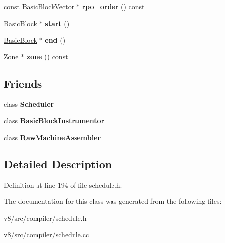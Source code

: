 \begin{DoxyCompactItemize}
\mbox{\label{classv8_1_1internal_1_1compiler_1_1Schedule_a739858a02ad92eafc2d2d537ecbdba2e}} 
const \mbox{\hyperlink{classv8_1_1internal_1_1ZoneVector}{Basic\+Block\+Vector}} $\ast$ {\bfseries rpo\+\_\+order} () const
\item 
\mbox{\label{classv8_1_1internal_1_1compiler_1_1Schedule_adddc0d247b7f03ccf5796854cf34b4bc}} 
\mbox{\hyperlink{classv8_1_1internal_1_1compiler_1_1BasicBlock}{Basic\+Block}} $\ast$ {\bfseries start} ()
\item 
\mbox{\label{classv8_1_1internal_1_1compiler_1_1Schedule_a3c3967add3df64ec380f3e06644e1b2c}} 
\mbox{\hyperlink{classv8_1_1internal_1_1compiler_1_1BasicBlock}{Basic\+Block}} $\ast$ {\bfseries end} ()
\item 
\mbox{\label{classv8_1_1internal_1_1compiler_1_1Schedule_af5c106558a8a6b32ce014579a173b135}} 
\mbox{\hyperlink{classv8_1_1internal_1_1Zone}{Zone}} $\ast$ {\bfseries zone} () const
\end{DoxyCompactItemize}
\subsection*{Friends}
\begin{DoxyCompactItemize}
\item 
\mbox{\label{classv8_1_1internal_1_1compiler_1_1Schedule_afb88c77ea5daaefa6c8fa6bc5b9aa5c1}} 
class {\bfseries Scheduler}
\item 
\mbox{\label{classv8_1_1internal_1_1compiler_1_1Schedule_a5c39b0bbc0c1cfdda659556340bdcea9}} 
class {\bfseries Basic\+Block\+Instrumentor}
\item 
\mbox{\label{classv8_1_1internal_1_1compiler_1_1Schedule_a14407edaf8af33febf237ed95c292a7a}} 
class {\bfseries Raw\+Machine\+Assembler}
\end{DoxyCompactItemize}


\subsection{Detailed Description}


Definition at line 194 of file schedule.\+h.



The documentation for this class was generated from the following files\+:\begin{DoxyCompactItemize}
\item 
v8/src/compiler/schedule.\+h\item 
v8/src/compiler/schedule.\+cc\end{DoxyCompactItemize}
